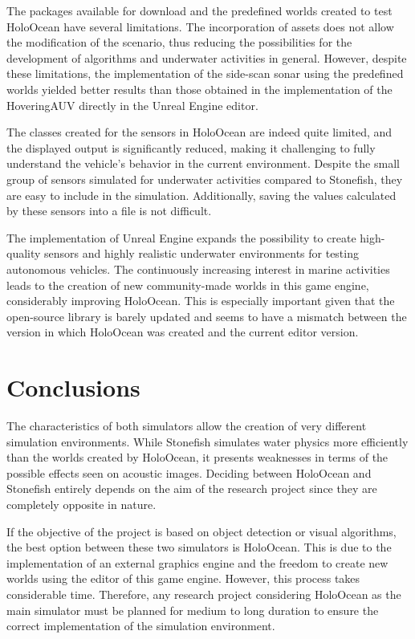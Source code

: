 \documentclass[]{article}
\begin{document}
	The packages available for download and the predefined worlds created to test HoloOcean have several limitations. The incorporation of assets does not allow the modification of the scenario, thus reducing the possibilities for the development of algorithms and underwater activities in general. However, despite these limitations, the implementation of the side-scan sonar using the predefined worlds yielded better results than those obtained in the implementation of the HoveringAUV directly in the Unreal Engine editor.
	
	The classes created for the sensors in HoloOcean are indeed quite limited, and the displayed output is significantly reduced, making it challenging to fully understand the vehicle's behavior in the current environment. Despite the small group of sensors simulated for underwater activities compared to Stonefish, they are easy to include in the simulation. Additionally, saving the values calculated by these sensors into a file is not difficult.
	
	The implementation of Unreal Engine expands the possibility to create high-quality sensors and highly realistic underwater environments for testing autonomous vehicles. The continuously increasing interest in marine activities leads to the creation of new community-made worlds in this game engine, considerably improving HoloOcean. This is especially important given that the open-source library is barely updated and seems to have a mismatch between the version in which HoloOcean was created and the current editor version.
 
	
	\newpage
	
	\section{Conclusions}
	
	
	The characteristics of both simulators allow the creation of very different simulation environments. While Stonefish simulates water physics more efficiently than the worlds created by HoloOcean, it presents weaknesses in terms of the possible effects seen on acoustic images. Deciding between HoloOcean and Stonefish entirely depends on the aim of the research project since they are completely opposite in nature.
	
	If the objective of the project is based on object detection or visual algorithms, the best option between these two simulators is HoloOcean. This is due to the implementation of an external graphics engine and the freedom to create new worlds using the editor of this game engine. However, this process takes considerable time. Therefore, any research project considering HoloOcean as the main simulator must be planned for medium to long duration to ensure the correct implementation of the simulation environment.
	
\end{document}
